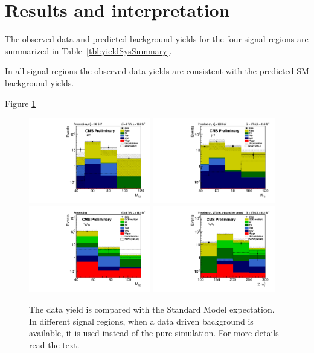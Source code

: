 \section{Results and interpretation}
\label{sect:stat}
The observed data and predicted background yields for the four signal regions are summarized in Table~\ref{tbl:yieldSysSummary}. 

In all signal regions the observed data yields are consistent with the predicted SM background yields.

Figure \ref{fig:yield_final}
\begin{figure}[!htb]
\centering
\includegraphics[width=0.475\textwidth,keepaspectratio=true]{StatisticsFig/MT2_tauMTgt200_DDFakeEleTau.pdf}
\includegraphics[width=0.475\textwidth,keepaspectratio=true]{StatisticsFig/MT2muTau_tauMTgt200_DDFake.pdf}
\includegraphics[width=0.475\textwidth,keepaspectratio=true]{StatisticsFig/QCDWestimation_bin1.pdf}
\includegraphics[width=0.475\textwidth,keepaspectratio=true]{StatisticsFig/QCDWestimation_bin2.pdf}
\caption{The data yield is compared with the Standard Model expectation. In different signal regions, 
when a data driven background is available, it is used instead of the pure simulation. For more details read the text.}
\label{fig:yield_final}
\end{figure}
